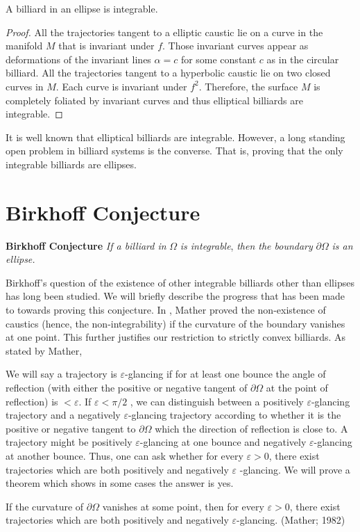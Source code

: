 \begin{remark}
A billiard in an ellipse is integrable.
\end{remark}

\begin{proof}
All the trajectories tangent to a elliptic caustic lie on a curve in the manifold $M$ that is invariant under $f$. Those invariant curves appear as deformations of the invariant lines $\alpha = c$ for some constant $c$ as in the circular billiard. All the trajectories tangent to a hyperbolic caustic lie on two closed curves in $M$. Each curve is invariant under $f^2$. Therefore, the surface $M$ is completely foliated by invariant curves and thus elliptical billiards are integrable. 
\end{proof}

It is well known that elliptical billiards are integrable. However, a long standing open problem in billiard systems is the converse. That is, proving that the only integrable billiards are ellipses.

\section{Birkhoff Conjecture}

\textbf{Birkhoff Conjecture} \textit{If a billiard in }$\Omega$ \textit{ is integrable}, \textit{then the boundary } $\partial\Omega$ \textit{ is an ellipse.}
\newline

Birkhoff's question of the existence of other integrable billiards other than ellipses has long been studied. We will briefly describe the progress that has been made to towards proving this conjecture.
In \cite{Mather1982}, Mather proved the non-existence of caustics (hence, the non-integrability) if the curvature of the boundary vanishes at one point. This further justifies our restriction to strictly convex billiards. As stated by Mather,

We will say a trajectory is $\varepsilon$-glancing if for at least one bounce the angle of reflection (with either the positive or negative tangent of $\partial \Omega$ at the point of reflection) is $ < \varepsilon$. If  $\varepsilon < \pi/2$ , we can distinguish between a positively  $\varepsilon$-glancing trajectory and
a negatively $\varepsilon$-glancing trajectory according to whether it is the positive or negative tangent to $\partial \Omega$ which the direction of reflection is close to.
A trajectory might be positively $ \varepsilon$-glancing at one bounce and negatively $\varepsilon$-glancing at another bounce. Thus, one can ask whether for every  $\varepsilon> 0$, there exist
trajectories which are both positively and negatively $\varepsilon$ -glancing. We will prove a
theorem which shows in some cases the answer is yes.
\begin{theorem}
If the curvature of $\partial \Omega$ vanishes at some point, then for every  $\varepsilon > 0$, there exist trajectories which are both positively and negatively  $\varepsilon$-glancing. (Mather; 1982)
\end{theorem}

